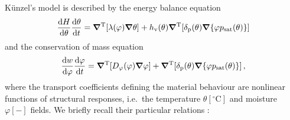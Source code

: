\documentclass[preprint,12pt]{elsarticle}
\newcommand{\vek}[1]{\mathchoice{\displaystyle\boldsymbol#1}
{\textstyle\boldsymbol#1}{\scriptstyle\boldsymbol#1}
{\scriptscriptstyle\boldsymbol#1}}
\begin{document}
K\"unzel's model is described by the energy balance equation
\begin{equation}
  \frac{\mathrm{d}H}{\mathrm{d}\theta}\frac{\mathrm{d}\theta}{\mathrm{d}t}
  =  \vek{\nabla}^{\mathrm{T}}[\lambda(\varphi)\vek{\nabla} \theta]+h_{\mathrm{v}}(\theta)\vek{\nabla}^{\mathrm{T}}
  [\delta_{\mathrm{p}}(\theta)\vek{\nabla}\{\varphi p_{\mathrm{sat}}(\theta)\}]
\label{eq:TE03}
\end{equation}
and the conservation of mass equation
\begin{equation}
\frac{\mathrm{d}w}{\mathrm{d}\varphi}\frac{\mathrm{d}
\varphi}{\mathrm{d}t}  =  \vek{\nabla}^{\mathrm{T}}
[D_{\varphi}(\varphi)\vek{\nabla}\varphi]+\vek{\nabla}^{\mathrm{T}}
[\delta_{\mathrm{p}}(\theta)\vek{\nabla}\{\varphi p_{\mathrm{sat}}(\theta)\}] \, ,
\label{eq:TE04}
\end{equation}
where the transport coefficients defining the material behaviour are
nonlinear functions of structural responses, i.e.\ the temperature
$\theta [^\circ\mathrm{C}]$ and moisture $\varphi [-]$ fields. We
briefly recall their particular relations \cite{Kunzel:1997}:
\end{document}
